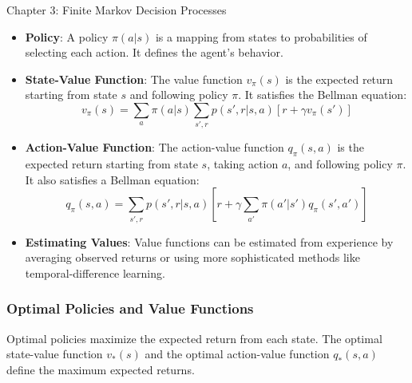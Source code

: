 \begin{notes}{Chapter 3: Finite Markov Decision Processes}
\begin{highlight}
        \begin{itemize}
            \item \textbf{Policy}: A policy \(\pi(a|s)\) is a mapping from states to probabilities of selecting each action. It defines the agent's behavior.
            \item \textbf{State-Value Function}: The value function \(v_{\pi}(s)\) is the expected return starting from state \(s\) and following policy \(\pi\). It satisfies the Bellman equation:
            \[
            v_{\pi}(s) = \sum_{a} \pi(a|s) \sum_{s', r} p(s', r | s, a) \left[ r + \gamma v_{\pi}(s') \right]
            \]
            \item \textbf{Action-Value Function}: The action-value function \(q_{\pi}(s, a)\) is the expected return starting from state \(s\), taking action \(a\), and following policy \(\pi\). It 
            also satisfies a Bellman equation:
            \[
            q_{\pi}(s, a) = \sum_{s', r} p(s', r | s, a) \left[ r + \gamma \sum_{a'} \pi(a'|s') q_{\pi}(s', a') \right]
            \]
            \item \textbf{Estimating Values}: Value functions can be estimated from experience by averaging observed returns or using more sophisticated methods like temporal-difference learning.
        \end{itemize}
    
    \end{highlight}
    
    \subsubsection*{Optimal Policies and Value Functions}
    
    Optimal policies maximize the expected return from each state. The optimal state-value function \(v_*(s)\) and the optimal action-value function \(q_*(s, a)\) define the maximum expected returns.
    
    \begin{highlight}
    

\end{highlight}
\end{notes}
